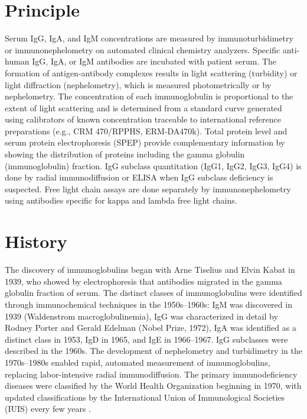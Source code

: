 \section*{Principle}
Serum IgG, IgA, and IgM concentrations are measured by immunoturbidimetry or immunonephelometry on automated clinical chemistry analyzers. Specific anti-human IgG, IgA, or IgM antibodies are incubated with patient serum. The formation of antigen-antibody complexes results in light scattering (turbidity) or light diffraction (nephelometry), which is measured photometrically or by nephelometry. The concentration of each immunoglobulin is proportional to the extent of light scattering and is determined from a standard curve generated using calibrators of known concentration traceable to international reference preparations (e.g., CRM 470/RPPHS, ERM-DA470k). Total protein level and serum protein electrophoresis (SPEP) provide complementary information by showing the distribution of proteins including the gamma globulin (immunoglobulin) fraction. IgG subclass quantitation (IgG1, IgG2, IgG3, IgG4) is done by radial immunodiffusion or ELISA when IgG subclass deficiency is suspected. Free light chain assays are done separately by immunonephelometry using antibodies specific for kappa and lambda free light chains.

\section*{History}
The discovery of immunoglobulins began with Arne Tiselius and Elvin Kabat in 1939, who showed by electrophoresis that antibodies migrated in the gamma globulin fraction of serum. The distinct classes of immunoglobulins were identified through immunochemical techniques in the 1950s--1960s: IgM was discovered in 1939 (Waldenstrom macroglobulinemia), IgG was characterized in detail by Rodney Porter and Gerald Edelman (Nobel Prize, 1972), IgA was identified as a distinct class in 1953, IgD in 1965, and IgE in 1966--1967. IgG subclasses were described in the 1960s. The development of nephelometry and turbidimetry in the 1970s--1980s enabled rapid, automated measurement of immunoglobulins, replacing labor-intensive radial immunodiffusion. The primary immunodeficiency diseases were classified by the World Health Organization beginning in 1970, with updated classifications by the International Union of Immunological Societies (IUIS) every few years \cite{picard2018international}.

